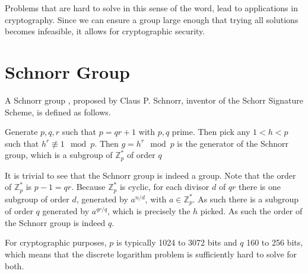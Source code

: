 Problems that are hard to solve in this sense of the word, lead to applications in cryptography. Since we can ensure a group large enough that trying all solutions becomes infeasible, it allows for cryptographic security.



\section{Schnorr Group} \label{SchnorrGroup}
A Schnorr group \cite{Schnorr}, proposed by Claus P. Schnorr, inventor of the Schorr Signature Scheme, is defined as follows.
\begin{defn}
	Generate $p,q,r$ such that $p=qr+1$ with $p,q$ prime. Then pick any $1<h<p$ such that $h^r\not\equiv1\mod{p}$. Then $g=h^r\mod{p}$ is the generator of the Schnorr group, which is a subgroup of $\mathbb{Z}_{p}^*$ of order $q$
\end{defn}
\begin{prf}
	It is trivial to see that the Schnorr group is indeed a group. Note that the order of $\mathbb{Z}_{p}^*$ is $p-1=qr$. Because $\mathbb{Z}_{p}^*$ is cyclic, for each divisor $d$ of $qr$ there is one subgroup of order $d$, generated by $a^{n/d}$, with $a\in\mathbb{Z}_{p}^*$. As such there is a subgroup of order $q$ generated by $a^{qr/q}$, which is precisely the $h$ picked. As such the order of the Schnorr group is indeed $q$.
\end{prf}
For cryptographic purposes, $p$ is typically 1024 to 3072 bits and $q$ 160 to 256 bits, which means that the discrete logarithm problem is sufficiently hard to solve for both.
